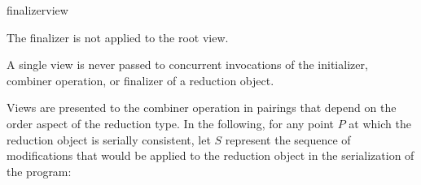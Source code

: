 \begin{bnf}
\terminal{(*}finalizer\terminal{)(\&}view\terminal{);}
\end{bnf}

The finalizer is not applied to the root view.

\begin{note}
A single view is never passed to concurrent invocations
of the initializer, combiner operation, or finalizer
of a reduction object.
\end{note}

\pnum
Views are presented to the combiner operation in pairings
that depend on the order aspect of the reduction type.
In the following,
for any point
$P$
at which the reduction object is serially consistent,
let
$S$
represent the sequence of modifications
that would be applied to the reduction object
in the serialization of the program:

